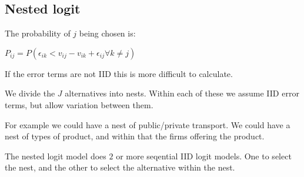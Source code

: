 
\subsection{Nested logit}

The probability of \(j\) being chosen is:

\(P_{ij}=P(\epsilon_{ik} <v_{ij} -v_{ik} +\epsilon_{ij}\forall k\ne j)\)

If the error terms are not IID this is more difficult to calculate.

We divide the \(J\) alternatives into nests. Within each of these we assume IID error terms, but allow variation between them.

For example we could have a nest of public/private transport. We could have a nest of types of product, and within that the firms offering the product.

The nested logit model does \(2\) or more seqential IID logit models. One to select the nest, and the other to select the alternative within the nest.

